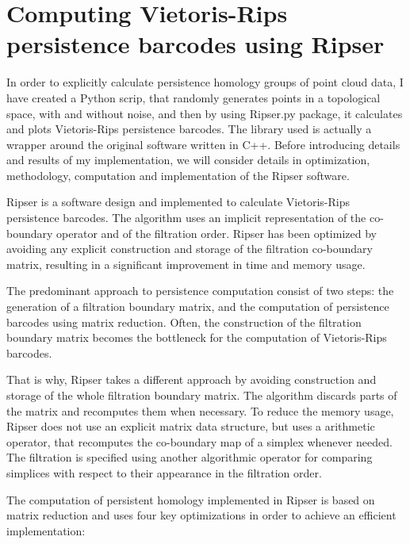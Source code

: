 \documentclass[11pt,a4paper]{report}
\begin{document}
            \section{Computing Vietoris-Rips persistence barcodes using Ripser}

            In order to explicitly calculate persistence homology groups of point cloud data, I have created a Python scrip, that randomly generates points in a topological space, with and without noise, and then by
            using Ripser.py package, it calculates and plots Vietoris-Rips persistence barcodes. The library used is actually a wrapper around the original software written in C++. Before introducing details and results of my implementation, we will consider details in optimization, methodology, computation and implementation of the Ripser software.

            Ripser is a software design and implemented to calculate Vietoris-Rips persistence barcodes. The algorithm uses
            an implicit representation of the co-boundary operator and of the filtration order. Ripser has been optimized by
            avoiding any explicit construction and storage of the filtration co-boundary matrix, resulting in a significant improvement in time and memory usage.

            The predominant approach to persistence computation consist of two steps: the generation of a filtration
            boundary matrix, and the computation of persistence barcodes using matrix reduction. Often, the construction of the filtration boundary matrix becomes
                the bottleneck for the computation of Vietoris-Rips barcodes.

            That is why, Ripser takes a different approach by avoiding construction and storage of the whole filtration boundary matrix. The algorithm discards parts of the matrix and recomputes them when necessary. To reduce the memory usage, Ripser does not use an explicit matrix data structure, but uses a arithmetic operator,
            that recomputes the co-boundary map of a simplex whenever needed. The filtration is specified using another algorithmic operator for
            comparing simplices with respect to their appearance in the filtration order.

            The computation of persistent homology implemented in Ripser is based on matrix reduction and uses four key
            optimizations in order to achieve an efficient implementation:
\end{document}
